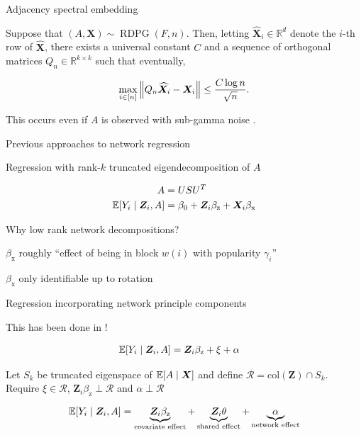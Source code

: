 \documentclass{beamer}
\theoremstyle{remark}
\newcommand{\X}{\bm X}
\newcommand{\Z}{\bm Z}
\newcommand{\Xhat}{\widehat{\X}}
\newcommand \R {\mathbb{R}}
\newcommand{\betazero}{\beta_0}
\newcommand{\RDPG}{\operatorname{RDPG}}
\newcommand \dist {\sim}
\DeclarePairedDelimiter{\brac}{[}{]}
\DeclarePairedDelimiter{\norm}{\lVert}{\rVert}
\newcommand{\E}[2][]{%
   \ifthenelse{ \equal{#1}{} }
      {\ensuremath{\mathbb{E} \brac*{#2}}}
      {\ensuremath{\mathbb{E} \brac*{#2 \mid #1}}}
}
\begin{document}
\begin{frame}{Adjacency spectral embedding}

    \begin{lemma}
        \label{lem:2toinfty}

        Suppose that $(A, \X) \dist \RDPG(F,n)$. Then, letting $\Xhat_i \in \R^d$ denote the $i$-th row of $\Xhat$, there exists a universal constant $C$ and a sequence of orthogonal matrices $Q_n \in \R^{k \times k}$ such that eventually,

        \begin{equation*}
            \max_{i \in [n]} \, \norm*{Q_n \Xhat_i - \X_i} \le \frac{C \log n}{\sqrt n}.
        \end{equation*}

        This occurs even if $A$ is observed with sub-gamma noise \citep{levin_recovering_2022}.

    \end{lemma}
\end{frame}

\begin{frame}{Previous approaches to network regression}

    Regression with rank-$k$ truncated eigendecomposition of $A$

    \begin{align*}
        A                & = U S U^T                                               \\
        \E[\Z_i, A]{Y_i} & = \betazero + \Z_i \beta_\text{z} + \X_i \beta_\text{x}
    \end{align*}

    Why low rank network decompositions?

    $\beta_\text{x}$ roughly ``effect of being in block $w(i)$ with popularity $\gamma_i$''

    $\beta_\text{x}$ only identifiable up to rotation

\end{frame}

\begin{frame}{Regression incorporating network principle components}

    This has been done in \cite{le_linear_2021}!

    \begin{align*}
        \E[\Z_i, A]{Y_i} & = \Z_i \beta_\text{z} + \xi + \alpha
    \end{align*}

    Let $S_k$ be truncated eigenspace of $\E[\X]{A}$ and define $\mathcal R = \mathrm{col}(\Z) \cap S_k$. Require $\xi \in \mathcal R$, $\Z_i \beta_\text{z} \perp \mathcal R$ and $\alpha \perp \mathcal R$

    \begin{align*}
        \E[\Z_i, A]{Y_i} =
        \underbrace{\Z_i \beta_\text{z}}_\text{covariate effect} +
        \underbrace{\Z_i \theta}_\text{shared effect} +
        \underbrace{\alpha}_\text{network effect}
    \end{align*}
\end{frame}
\end{document}
